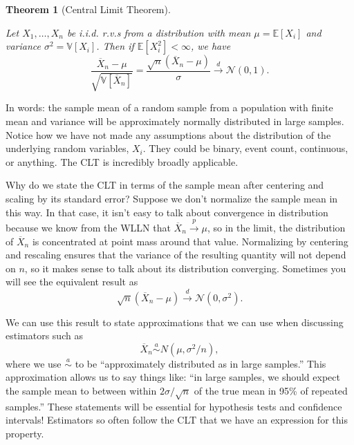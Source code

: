 \documentclass[
  13pt,
  letterpaper,
  DIV=11,
  numbers=noendperiod]{scrreprt}
\newcommand{\E}{\mathbb{E}}
\newcommand{\V}{\mathbb{V}}
\newcommand{\N}{\mathcal{N}}
\newcommand{\Xbar}{\overline{X}}
\newcommand{\inprob}{\overset{p}{\to}}
\newcommand{\indist}{\overset{d}{\to}}
\theoremstyle{definition}
\theoremstyle{definition}
\theoremstyle{plain}
\newtheorem{theorem}{Theorem}[chapter]
\theoremstyle{remark}
\begin{document}
\begin{theorem}[Central Limit
Theorem]\protect\hypertarget{thm-clt}{}\label{thm-clt}

Let \(X_1, \ldots, X_n\) be i.i.d. r.v.s from a distribution with mean
\(\mu = \E[X_i]\) and variance \(\sigma^2 = \V[X_i]\). Then if
\(\E[X_i^2] < \infty\), we have \[
\frac{\Xbar_n - \mu}{\sqrt{\V[\Xbar_n]}} = \frac{\sqrt{n}\left(\Xbar_n - \mu\right)}{\sigma} \indist \N(0, 1).
\]

\end{theorem}

In words: the sample mean of a random sample from a population with
finite mean and variance will be approximately normally distributed in
large samples. Notice how we have not made any assumptions about the
distribution of the underlying random variables, \(X_i\). They could be
binary, event count, continuous, or anything. The CLT is incredibly
broadly applicable.

\begin{tcolorbox}[enhanced jigsaw, leftrule=.75mm, colbacktitle=quarto-callout-note-color!10!white, title=\textcolor{quarto-callout-note-color}{\faInfo}\hspace{0.5em}{Notation alert}, toptitle=1mm, breakable, left=2mm, toprule=.15mm, arc=.35mm, opacitybacktitle=0.6, opacityback=0, colback=white, rightrule=.15mm, titlerule=0mm, colframe=quarto-callout-note-color-frame, bottomtitle=1mm, bottomrule=.15mm, coltitle=black]

Why do we state the CLT in terms of the sample mean after centering and
scaling by its standard error? Suppose we don't normalize the sample
mean in this way. In that case, it isn't easy to talk about convergence
in distribution because we know from the WLLN that
\(\Xbar_n \inprob \mu\), so in the limit, the distribution of
\(\Xbar_n\) is concentrated at point mass around that value. Normalizing
by centering and rescaling ensures that the variance of the resulting
quantity will not depend on \(n\), so it makes sense to talk about its
distribution converging. Sometimes you will see the equivalent result as
\[
\sqrt{n}\left(\Xbar_n - \mu\right) \indist \N(0, \sigma^2).
\]

\end{tcolorbox}

We can use this result to state approximations that we can use when
discussing estimators such as \[
\Xbar_n \overset{a}{\sim} N(\mu, \sigma^2/n),
\] where we use \(\overset{a}{\sim}\) to be ``approximately distributed
as in large samples.'' This approximation allows us to say things like:
``in large samples, we should expect the sample mean to between within
\(2\sigma/\sqrt{n}\) of the true mean in 95\% of repeated samples.''
These statements will be essential for hypothesis tests and confidence
intervals! Estimators so often follow the CLT that we have an expression
for this property.
\end{document}
